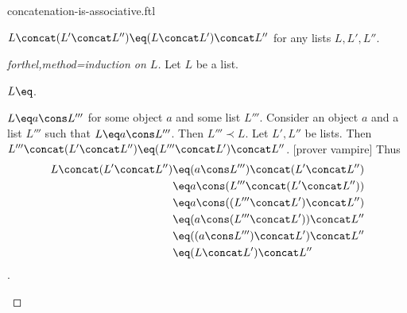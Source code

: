 \documentclass{stex}
\begin{document}
\begin{smodule}{concatenation-is-associative.ftl}


\begin{proposition}[forthel,id=ConcatIsAssociativeProp]
  $L \concat (L' \concat L'') \eq (L \concat L') \concat L''$ for any lists $L, L', L''$.
\end{proposition}
\begin{proof}[forthel,method=induction on $L$]
  Let $L$ be a list.

  \begin{case}{$L \eq \list{}$.} \end{case}

  \begin{case}{$L \eq a \cons L'''$ for some object $a$ and some list $L'''$.}
    Consider an object $a$ and a list $L'''$ such that $L \eq a \cons L'''$.
    Then $L''' \prec L$.
    Let $L',L''$ be lists.
    Then $L''' \concat (L' \concat L'') \eq (L''' \concat L') \concat L''$.
    [prover vampire]
    Thus
    \begin{align*}
      L \concat (L' \concat L'') 
        &\eq (a \cons L''') \concat (L' \concat L'')\\
        &\eq a \cons (L''' \concat (L' \concat L''))\\
        &\eq a \cons ((L''' \concat L') \concat L'')\\
        &\eq (a \cons (L''' \concat L')) \concat L''\\
        &\eq ((a \cons L''') \concat L') \concat L''\\
        &\eq (L \concat L') \concat L''
    \end{align*}.
  \end{case}
\end{proof}

\end{smodule}
\end{document}
